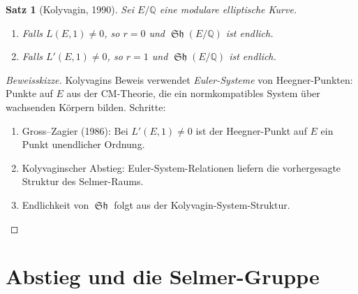\documentclass[12pt,a4paper]{amsart}
\newtheorem{theorem}{Satz}[section]
\theoremstyle{definition}
\newcommand{\Q}{\mathbb{Q}}
\DeclareMathOperator{\Sha}{\mathfrak{Sh}}
\begin{document}
\begin{theorem}[Kolyvagin, 1990]
\label{thm:kolyvagin}
Sei $E/\Q$ eine modulare elliptische Kurve.
\begin{enumerate}
  \item[\textup{(i)}] Falls $L(E,1) \ne 0$, so $r = 0$ und
    $\Sha(E/\Q)$ ist endlich.
  \item[\textup{(ii)}] Falls $L'(E,1) \ne 0$, so $r = 1$ und
    $\Sha(E/\Q)$ ist endlich.
\end{enumerate}
\end{theorem}

\begin{proof}[Beweisskizze]
Kolyvagins Beweis \cite{Kolyvagin1990} verwendet \emph{Euler-Systeme}
von Heegner-Punkten: Punkte auf $E$ aus der CM-Theorie, die ein
normkompatibles System \"uber wachsenden K\"orpern bilden.
Schritte:
\begin{enumerate}
  \item Gross--Zagier (1986): Bei $L'(E,1) \ne 0$ ist der Heegner-Punkt
    auf $E$ ein Punkt unendlicher Ordnung.
  \item Kolyvaginscher Abstieg: Euler-System-Relationen liefern die
    vorhergesagte Struktur des Selmer-Raums.
  \item Endlichkeit von $\Sha$ folgt aus der Kolyvagin-System-Struktur.
\end{enumerate}
\end{proof}

\section{Abstieg und die Selmer-Gruppe}
\end{document}
